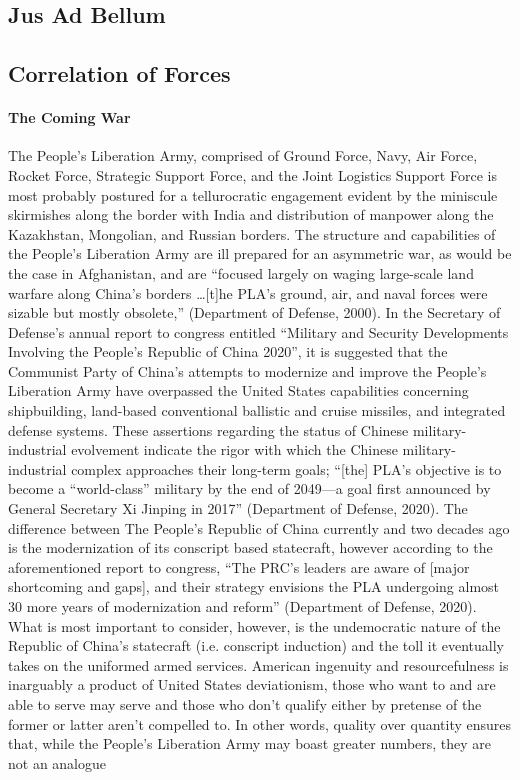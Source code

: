 \documentclass[12pt]{article}
\begin{document}
\begin{center}
    \section{\normalsize Jus Ad Bellum}
\end{center}
\begin{center}
\subsection{\normalsize Correlation of Forces}
\end{center}

\paragraph{The Coming War} The People's Liberation Army, comprised of Ground Force, Navy, Air Force, Rocket Force, Strategic Support Force, and the Joint Logistics Support Force is most probably postured for a tellurocratic engagement evident by the miniscule skirmishes along the border with India and distribution of manpower along the Kazakhstan, Mongolian, and Russian borders. The structure and capabilities of the People's Liberation Army are ill prepared for an asymmetric war, as would be the case in Afghanistan, and are “focused largely on waging large-scale land warfare along China’s borders \dots [t]he PLA’s ground, air, and naval forces were sizable but mostly obsolete,” (Department of Defense, 2000). In the Secretary of Defense's annual report to congress entitled “Military and Security Developments Involving the People’s Republic of China 2020”, it is suggested that the Communist Party of China's attempts to modernize and improve the People's Liberation Army have overpassed the United States capabilities concerning shipbuilding, land-based conventional ballistic and cruise missiles, and integrated defense systems. These assertions regarding the status of Chinese military-industrial evolvement indicate the rigor with which the Chinese military-industrial complex approaches their long-term goals; “[the] PLA's objective is to become a “world-class” military by the end of 2049—a goal first announced by General Secretary Xi Jinping in 2017” (Department of Defense, 2020). The difference between The People's Republic of China currently and two decades ago is the modernization of its conscript based statecraft, however according to the aforementioned report to congress, “The PRC's leaders are aware of [major shortcoming and gaps], and their strategy envisions the PLA undergoing almost 30 more years of modernization and reform” (Department of Defense, 2020). What is most important to consider, however, is the undemocratic nature of the Republic of China's statecraft (i.e. conscript induction) and the toll it eventually takes on the uniformed armed services. American ingenuity and resourcefulness is inarguably a product of United States deviationism, those who want to and are able to serve may serve and those who don't qualify either by pretense of the former or latter aren't compelled to. In other words, quality over quantity ensures that, while the People's Liberation Army may boast greater numbers, they are not an analogue 
\end{document}
